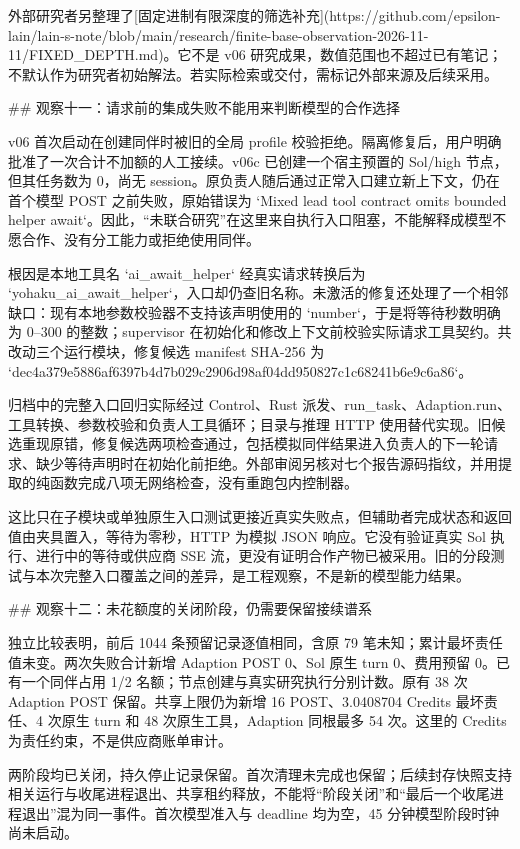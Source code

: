 外部研究者另整理了[固定进制有限深度的筛选补充](https://github.com/epsilon-lain/lain-s-note/blob/main/research/finite-base-observation-2026-11-11/FIXED_DEPTH.md)。它不是 v06 研究成果，数值范围也不超过已有笔记；不默认作为研究者初始解法。若实际检索或交付，需标记外部来源及后续采用。

## 观察十一：请求前的集成失败不能用来判断模型的合作选择

v06 首次启动在创建同伴时被旧的全局 profile 校验拒绝。隔离修复后，用户明确批准了一次合计不加额的人工接续。v06c 已创建一个宿主预置的 Sol/high 节点，但其任务数为 0，尚无 session。原负责人随后通过正常入口建立新上下文，仍在首个模型 POST 之前失败，原始错误为 `Mixed lead tool contract omits bounded helper await`。因此，“未联合研究”在这里来自执行入口阻塞，不能解释成模型不愿合作、没有分工能力或拒绝使用同伴。

根因是本地工具名 `ai_await_helper` 经真实请求转换后为 `yohaku_ai_await_helper`，入口却仍查旧名称。未激活的修复还处理了一个相邻缺口：现有本地参数校验器不支持该声明使用的 `number`，于是将等待秒数明确为 0–300 的整数；supervisor 在初始化和修改上下文前校验实际请求工具契约。共改动三个运行模块，修复候选 manifest SHA-256 为 `dec4a379e5886af6397b4d7b029c2906d98af04dd950827c1c68241b6e9c6a86`。

归档中的完整入口回归实际经过 Control、Rust 派发、run_task、Adaption.run、工具转换、参数校验和负责人工具循环；目录与推理 HTTP 使用替代实现。旧候选重现原错，修复候选两项检查通过，包括模拟同伴结果进入负责人的下一轮请求、缺少等待声明时在初始化前拒绝。外部审阅另核对七个报告源码指纹，并用提取的纯函数完成八项无网络检查，没有重跑包内控制器。

这比只在子模块或单独原生入口测试更接近真实失败点，但辅助者完成状态和返回值由夹具置入，等待为零秒，HTTP 为模拟 JSON 响应。它没有验证真实 Sol 执行、进行中的等待或供应商 SSE 流，更没有证明合作产物已被采用。旧的分段测试与本次完整入口覆盖之间的差异，是工程观察，不是新的模型能力结果。

## 观察十二：未花额度的关闭阶段，仍需要保留接续谱系

独立比较表明，前后 1044 条预留记录逐值相同，含原 79 笔未知；累计最坏责任值未变。两次失败合计新增 Adaption POST 0、Sol 原生 turn 0、费用预留 0。已有一个同伴占用 1/2 名额；节点创建与真实研究执行分别计数。原有 38 次 Adaption POST 保留。共享上限仍为新增 16 POST、3.0408704 Credits 最坏责任、4 次原生 turn 和 48 次原生工具，Adaption 同根最多 54 次。这里的 Credits 为责任约束，不是供应商账单审计。

两阶段均已关闭，持久停止记录保留。首次清理未完成也保留；后续封存快照支持相关运行与收尾进程退出、共享租约释放，不能将“阶段关闭”和“最后一个收尾进程退出”混为同一事件。首次模型准入与 deadline 均为空，45 分钟模型阶段时钟尚未启动。

